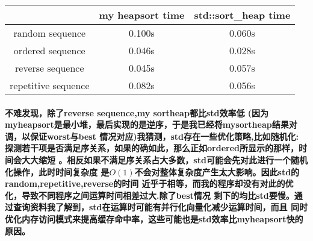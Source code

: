 \documentclass[UTF8]{ctexart}
\begin{document}
\par

\begin{tabular}{|c|c|c|} 
    \hline  %
     & my heapsort time & std::sort\_heap time \\  %
    \hline  %
    random sequence & 0.100s & 0.060s \\  %
    \hline
    ordered sequence & 0.046s & 0.028s \\  %
    \hline  %
    reverse sequence & 0.045s & 0.057s \\
    \hline
    repetitive sequence & 0.082s & 0.056s \\
    \hline
\end{tabular}


\par

\paragraph{\hspace{2em}不难发现，除了reverse sequence,my sortheap都比std效率低
(因为myheapsort是最小堆，最后实现的是逆序，于是我已经将mysortheap结果对调，以保证worst与best
情况对应)我猜测，std存在一些优化策略,比如随机化:
探测若干项是否满足序关系，如果的确如此，那么正如ordered所显示的那样，时间会大大缩短
。相反如果不满足序关系占大多数，std可能会先对此进行一个随机化操作，此时时间复杂度
是$O(1)$不会对整体复杂度产生太大影响。因此std的random,repetitive,reverse的时间
近乎于相等，而我的程序却没有对此的优化，导致不同程序之间运算时间相差过大.除了best情况
剩下的均比std要慢。通过查询资料我了解到，std在运算时可能有并行化向量化减少运算时间，而且
同时优化内存访问模式来提高缓存命中率，这些可能也是std效率比myheapsort快的原因。}
\end{document}

